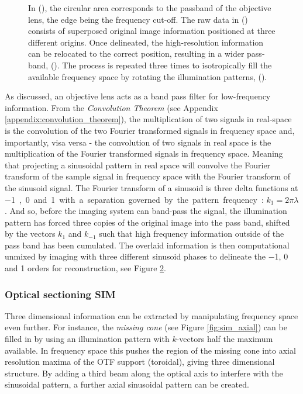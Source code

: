 \begin{figure}
\begin{subfigure}[t]{0.1\textwidth}
        \label{fig:sim_coordinates}
    \end{subfigure}
    \hfill
    \caption{
        In (), the circular area corresponds to the passband of the \gls{objective lens}, the edge being the frequency cut-off.
        The raw data in () consists of superposed original image information
        positioned at three different origins.
        Once delineated, the high-resolution information can be relocated to the correct position, resulting in a wider pass-band, ().
        The process is repeated three times to isotropically fill the available frequency space by rotating the illumination patterns, ().
        }
    \label{fig:sim_flowers}
\end{figure}

As discussed, an \gls{objective lens} acts as a band pass filter for low-frequency information.
From the \emph{Convolution Theorem} (see Appendix \ref{appendix:convolution_theorem}), the multiplication of two signals in real-space is the convolution of the two \gls{Fourier transform}ed signals in frequency space and, importantly, visa versa -
the convolution of two signals in real space is the multiplication of the Fourier transformed signals in frequency space.
Meaning that projecting a sinusoidal pattern in real space will convolve the Fourier transform of the sample signal in frequency space with the Fourier transform of the sinusoid signal.
The Fourier transform of a sinusoid is three delta functions at \SI{-1}, \SI{0} and \SI{+1} with a separation governed by the pattern frequency: $k_1 = {2\pi}{\lambda}$.
And so, before the imaging system can band-pass the signal, the illumination pattern has forced three copies of the original image into the pass band, shifted by the vectors $k_1$ and $k_{-1}$ such that high frequency information outside of the pass band has been cumulated.
The overlaid information is then computational unmixed by imaging with three different sinusoid phases to delineate the \SI{-1}{}, \SI{0}{} and \SI{+1}{} orders for reconstruction, see Figure \ref{fig:sim_flowers}.

\subsubsection{Optical sectioning \gls{SIM}}

Three dimensional information can be extracted by manipulating frequency space even further.
For instance, the \emph{\gls{missing cone}} (see Figure \ref{fig:sim_axial}) can be filled in by using an illumination pattern with $k$-vectors half the maximum available.
In frequency space this pushes the region of the missing cone into axial resolution maxima of the \gls{OTF} support (toroidal), giving three dimensional structure.
By adding a third beam along the optical axis to interfere with the sinusoidal pattern, a further axial sinusoidal pattern can be created.

